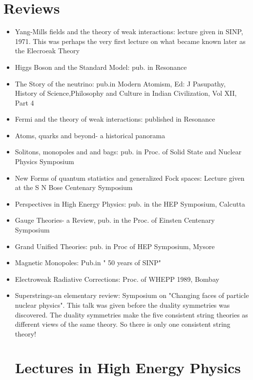 \section{Reviews}

\begin{itemize}
\item Yang-Mills fields and the theory of weak interactions: lecture given in SINP, 1971. This was perhaps the very first lecture on what became known later as the Elecroeak Theory 
\item Higgs Boson and the Standard Model: pub. in Resonance
\item The Story of the neutrino: pub.in Modern Atomism, Ed: J Pasupathy, History of Science,Philosophy and Culture in Indian Civilization, Vol XII, Part 4
\item Fermi and the theory of weak interactions: published in Resonance
\item Atoms, quarks and beyond- a historical panorama
\item Solitons, monopoles and and bags: pub. in Proc. of Solid State and Nuclear Physics Symposium
\item New Forms of quantum statistics and  generalized Fock spaces: Lecture given at the S N Bose Centenary Symposium
\item Perspectives in High Energy Physics: pub. in the  HEP Symposium, Calcutta
\item Gauge Theories- a Review, pub. in the Proc. of Einsten Centenary Symposium
\item Grand Unified Theories: pub. in Proc of HEP Symposium, Mysore
\item Magnetic Monopoles: Pub.in " 50 years of SINP"
\item Electroweak Radiative Corrections: Proc. of WHEPP 1989, Bombay
\item Superstrings-an elementary review: Symposium on "Changing faces of particle nuclear physics". This talk was given before the duality symmetries was discovered. The duality symmetries make the five consistent string theories as different views of the same theory. So there is only one consistent string theory!  

\section{Lectures in High Energy Physics}
                    

\end{itemize}
